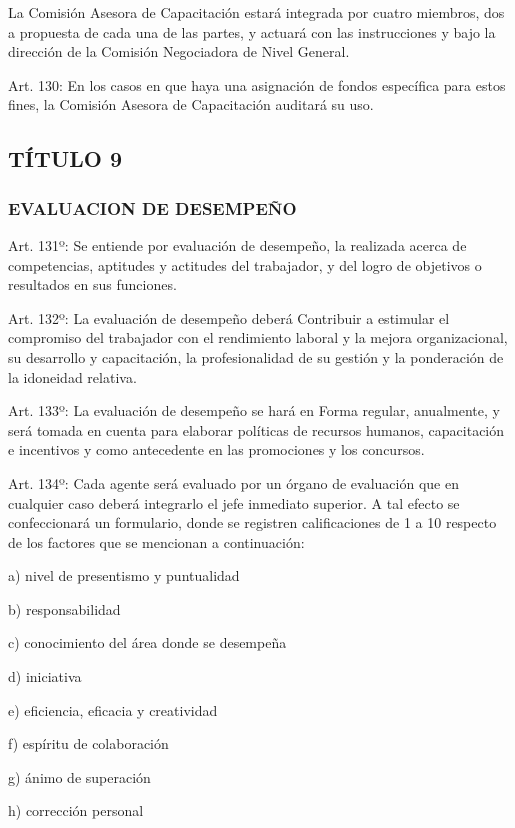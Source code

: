 \documentclass[]{article}
\begin{document}
La Comisión Asesora de Capacitación estará integrada por cuatro
miembros, dos a propuesta de cada una de las partes, y actuará con las
instrucciones y bajo la dirección de la Comisión Negociadora de Nivel
General.

Art. 130: En los casos en que haya una asignación de fondos específica
para estos fines, la Comisión Asesora de Capacitación auditará su uso.

\subsection{TÍTULO 9}\label{tuxedtulo-9}

\subsubsection{EVALUACION DE
DESEMPEÑO}\label{evaluacion-de-desempeuxf1o}

Art. 131º: Se entiende por evaluación de desempeño, la realizada acerca
de competencias, aptitudes y actitudes del trabajador, y del logro de
objetivos o resultados en sus funciones.

Art. 132º: La evaluación de desempeño deberá Contribuir a estimular el
compromiso del trabajador con el rendimiento laboral y la mejora
organizacional, su desarrollo y capacitación, la profesionalidad de su
gestión y la ponderación de la idoneidad relativa.

Art. 133º: La evaluación de desempeño se hará en Forma regular,
anualmente, y será tomada en cuenta para elaborar políticas de recursos
humanos, capacitación e incentivos y como antecedente en las promociones
y los concursos.

Art. 134º: Cada agente será evaluado por un órgano de evaluación que en
cualquier caso deberá integrarlo el jefe inmediato superior. A tal
efecto se confeccionará un formulario, donde se registren calificaciones
de 1 a 10 respecto de los factores que se mencionan a continuación:

a) nivel de presentismo y puntualidad

b) responsabilidad

c) conocimiento del área donde se desempeña

d) iniciativa

e) eficiencia, eficacia y creatividad

f) espíritu de colaboración

g) ánimo de superación

h) corrección personal
\end{document}
